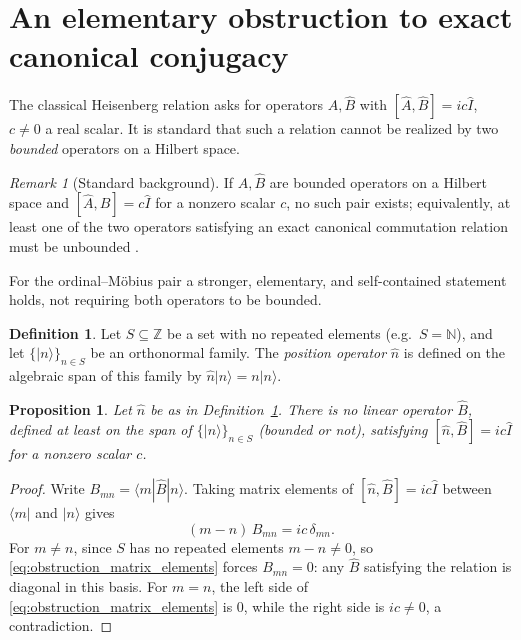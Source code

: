 \documentclass[11pt]{amsart}
\numberwithin{equation}{section}
\theoremstyle{plain}
\newtheorem{proposition}[theorem]{Proposition}
\theoremstyle{definition}
\newtheorem{definition}[theorem]{Definition}
\theoremstyle{remark}
\newtheorem{remark}[theorem]{Remark}
\newcommand{\N}{\mathbb{N}}
\newcommand{\Z}{\mathbb{Z}}
\begin{document}
\section{An elementary obstruction to exact canonical conjugacy}
\label{sec:obstruction}

The classical Heisenberg relation asks for operators $\hat A,\hat B$
with $[\hat A,\hat B]=ic\hat I$, $c\neq0$ a real scalar. It is standard
that such a relation cannot be realized by two \emph{bounded}
operators on a Hilbert space.

\begin{remark}[Standard background]
\label{rem:wintner_wielandt}
If $\hat A,\hat B$ are bounded operators on a Hilbert space and
$[\hat A,\hat B]=c\hat I$ for a nonzero scalar $c$, no such pair
exists; equivalently, at least one of the two operators satisfying an
exact canonical commutation relation must be unbounded
\cite{Wintner1947,Wielandt1949}.
\end{remark}

For the ordinal--M\"obius pair a stronger, elementary, and
self-contained statement holds, not requiring both operators to be
bounded.

\begin{definition}
\label{def:position_operator}
Let $S\subseteq\Z$ be a set with no repeated elements (e.g.\ $S=\N$),
and let $\{|n\rangle\}_{n\in S}$ be an orthonormal family. The
\emph{position operator} $\hat n$ is defined on the algebraic span of
this family by $\hat n|n\rangle=n|n\rangle$.
\end{definition}

\begin{proposition}
\label{prop:no_exact_conjugate}
Let $\hat n$ be as in Definition~\ref{def:position_operator}. There is
no linear operator $\hat B$, defined at least on the span of
$\{|n\rangle\}_{n\in S}$ (bounded or not), satisfying
$[\hat n,\hat B]=ic\hat I$ for a nonzero scalar $c$.
\end{proposition}

\begin{proof}
Write $B_{mn}=\langle m|\hat B|n\rangle$. Taking matrix elements of
$[\hat n,\hat B]=ic\hat I$ between $\langle m|$ and $|n\rangle$ gives
\begin{equation}
(m-n)\,B_{mn} = ic\,\delta_{mn}.
\label{eq:obstruction_matrix_elements}
\end{equation}
For $m\neq n$, since $S$ has no repeated elements $m-n\neq0$, so
\eqref{eq:obstruction_matrix_elements} forces $B_{mn}=0$: any $\hat B$
satisfying the relation is diagonal in this basis. For $m=n$, the left
side of \eqref{eq:obstruction_matrix_elements} is $0$, while the right
side is $ic\neq0$, a contradiction.
\end{proof}
\end{document}
